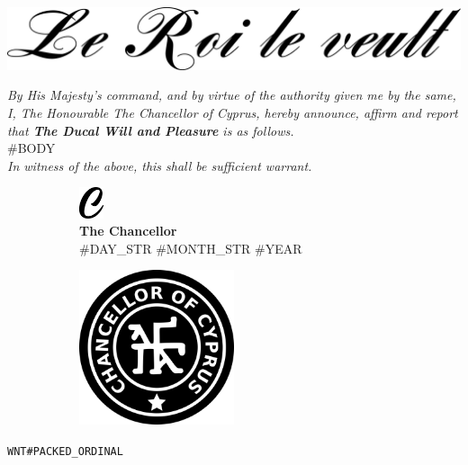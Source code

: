 \documentclass[varwidth=true,border=50pt]{standalone}
\begin{document}
\noindent \includegraphics[width=\textwidth]{le_roi_le_veult}

\vspace{10pt}

\textit{By His Majesty's command, and by virtue of the authority given me by the same, I, The Honourable The Chancellor of Cyprus, hereby announce, affirm and report that \textbf{The Ducal Will and Pleasure} is as follows.}\\

#BODY\\

\textit{In witness of the above, this shall be sufficient warrant.}

\vspace{20pt}

\begin{figure}
\centering
\begin{subfigure}{.5\textwidth}
    \centering
    \includegraphics[width=20pt]{c}\\
    \vspace{5pt}
    \textbf{The Chancellor}\\
    #DAY_STR #MONTH_STR #YEAR
\end{subfigure}%
\begin{subfigure}{.5\textwidth}
    \centering
    \includegraphics[width=0.5\textwidth]{stamp}
\end{subfigure}%
\end{figure}

\vspace{30pt}

\hfill {\footnotesize \texttt{WNT#PACKED_ORDINAL}}\\
{\tiny \texttt{}}
\end{document}
